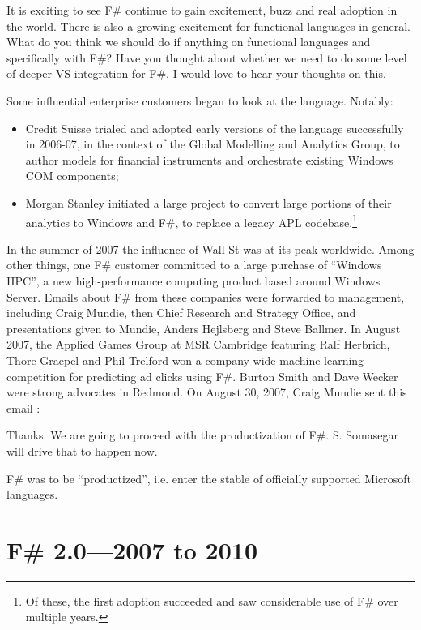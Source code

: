 \documentclass[acmsmall,screen]{acmart}
\begin{document}
\begin{verbquote}
It is exciting to see F# continue to gain excitement, buzz and real adoption in the world. There is also a growing excitement for functional languages in general. What do you think we should do if anything on functional languages and specifically with F#?  Have you thought about whether we need to do some level of deeper VS integration for F#.  I would love to hear your thoughts on this.
\end{verbquote}
Some influential enterprise customers began to look at the language.  Notably:

\begin{itemize}
\item Credit Suisse trialed and adopted early versions of the language successfully in 2006-07, in the context
of the Global Modelling and Analytics Group, to author models for financial instruments and orchestrate existing Windows COM components;
\item Morgan Stanley initiated a large project to convert large portions of their analytics to Windows and F\#, to
replace a legacy APL codebase.\footnote{Of these, the first adoption succeeded and saw considerable use of F\# over multiple years.}
\end{itemize}

In the summer of 2007 the influence of Wall St was at its peak worldwide. Among other things, one F\# customer
committed to a large purchase of “Windows HPC”, a new high-performance computing product based around
Windows Server. Emails about F\# from these companies were forwarded to management, including Craig Mundie,
then Chief Research and Strategy Office, and presentations given to Mundie, Anders Hejlsberg and Steve Ballmer.
In August 2007, the Applied Games Group at MSR Cambridge featuring Ralf Herbrich, Thore Graepel and Phil
Trelford won a company-wide machine learning competition for predicting ad clicks using F\#.  Burton Smith and
Dave Wecker were strong advocates in Redmond. On August 30, 2007, Craig Mundie sent this email \citep{RefPrivateEmailSoma}:
\begin{verbquote}
Thanks.  We are going to proceed with the productization of F#.  S. Somasegar will drive that to happen now.
\end{verbquote}
F\# was to be “productized”, i.e. enter the stable of officially supported Microsoft languages.

\section*{F\# 2.0---2007 to 2010}
\end{document}
